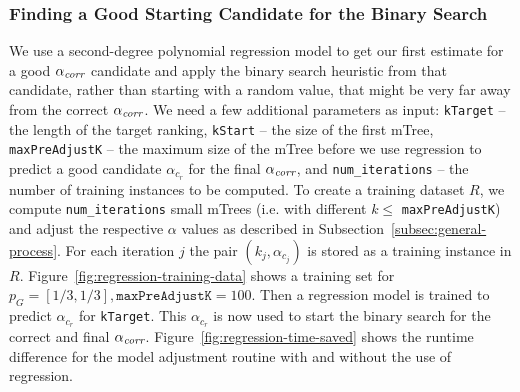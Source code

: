 \subsubsection{Finding a Good Starting Candidate for the Binary Search}
We use a second-degree polynomial regression model to get our first estimate for a good $\alpha_\textit{corr}$ candidate and apply the binary search heuristic from that candidate, rather than starting with a random value, that might be very far away from the correct $\alpha_\textit{corr}$.
%
We need a few additional parameters as input: \texttt{kTarget} -- the length of the target ranking, \texttt{kStart} -- the size of the first mTree, \texttt{maxPreAdjustK} -- the maximum size of the mTree before we use regression to predict a good candidate $\alpha_{c_r}$ for the final $\alpha_\textit{corr}$, and \texttt{num\_iterations} -- the number of training instances to be computed.
%
To create a training dataset $R$, we compute \texttt{num\_iterations} small mTrees (i.e. with different $k \leq $ \texttt{maxPreAdjustK}) and adjust the respective $\alpha$ values as described in Subsection~\ref{subsec:general-process}.
%
For each iteration $j$ the pair $(k_j, \alpha_{c_j})$ is stored as a training instance in $R$.
%
Figure~\ref{fig:regression-training-data} shows a training set for $p_G=[1/3, 1/3], \texttt{maxPreAdjustK}=100$.
%
Then a regression model is trained to predict $\alpha_{c_r}$ for \texttt{kTarget}.
%
This $\alpha_{c_r}$ is now used to start the binary search for the correct and final $\alpha_\textit{corr}$.
%
Figure~\ref{fig:regression-time-saved} shows the runtime difference for the model adjustment routine with and without the use of regression.

